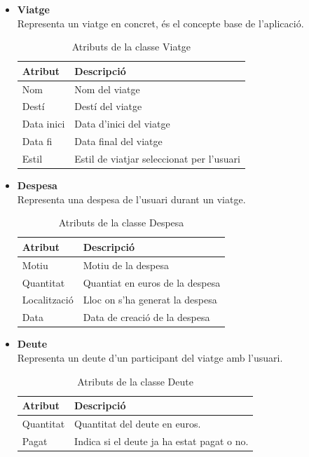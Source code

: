 \begin{itemize}
\item[]\textbf{Viatge}\\
Representa un viatge en concret, és el concepte base de l'aplicació.
\begin{table}[!h]
\centering
\begin{tabular}{|M|T|}
\hline
\textbf{Atribut}  & \textbf{Descripció} \\\hline
Nom &  Nom del viatge\\\hline
Destí &  Destí del viatge\\\hline
Data inici &  Data d'inici del viatge\\\hline
Data fi &  Data final del viatge\\\hline
Estil &  Estil de viatjar seleccionat per l'usuari\\\hline
\end{tabular}
\label{}
\caption{Atributs de la classe Viatge}
\end{table}

\clearpage

\item[]\textbf{Despesa}\\
Representa una despesa de l'usuari durant un viatge.

\begin{table}[!h]
\centering
\begin{tabular}{|M|T|}
\hline
\textbf{Atribut}  & \textbf{Descripció} \\\hline
Motiu &  Motiu de la despesa\\\hline
Quantitat &  Quantiat en euros de la despesa\\\hline
Localització &  Lloc on s'ha generat la despesa\\\hline
Data &  Data de creació de la despesa\\\hline
\end{tabular}
\label{}
\caption{Atributs de la classe Despesa}
\end{table}


\item[]\textbf{Deute}\\
Representa un deute d'un participant del viatge amb l'usuari.

\begin{table}[!h]
\centering
\begin{tabular}{|M|T|}
\hline
\textbf{Atribut}  & \textbf{Descripció} \\\hline
Quantitat & Quantitat del deute en euros.\\\hline
Pagat &  Indica si el deute ja ha estat pagat o no.\\\hline
\end{tabular}
\label{}
\caption{Atributs de la classe Deute}
\end{table}



\end{itemize}
